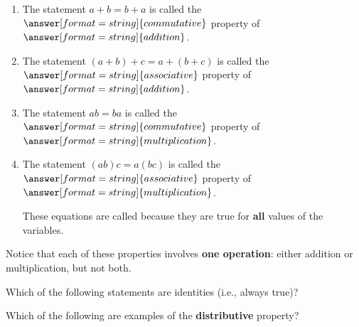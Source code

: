 \documentclass[nooutcomes]{ximera}
\begin{document}
\begin{problem}
\begin{enumerate}
\item The statement $a+b = b+a$ is called the $\answer[format=string]{commutative}$ property of $\answer[format=string]{addition}$.

\item The statement $(a+b)+c = a+(b+c)$ is called the $\answer[format=string]{associative}$ property of $\answer[format=string]{addition}$.

\item The statement $ab = ba$ is called the $\answer[format=string]{commutative}$ property of $\answer[format=string]{multiplication}$.

\item The statement $(ab)c = a(bc)$ is called the $\answer[format=string]{associative}$ property of $\answer[format=string]{multiplication}$. 

These equations are called  because they are true for \textbf{all} values of the variables.  
\end{enumerate}
Notice that each of these properties involves \textbf{one operation}: either addition or multiplication, but not both.  
\end{problem}

\begin{problem}
Which of the following statements are identities (i.e., always true)? 
\begin{selectAll}
\end{selectAll}
\end{problem}

\begin{problem}
Which of the following are examples of the \textbf{distributive} property? 
\begin{selectAll}
\end{selectAll}
\end{problem}
\end{document}
